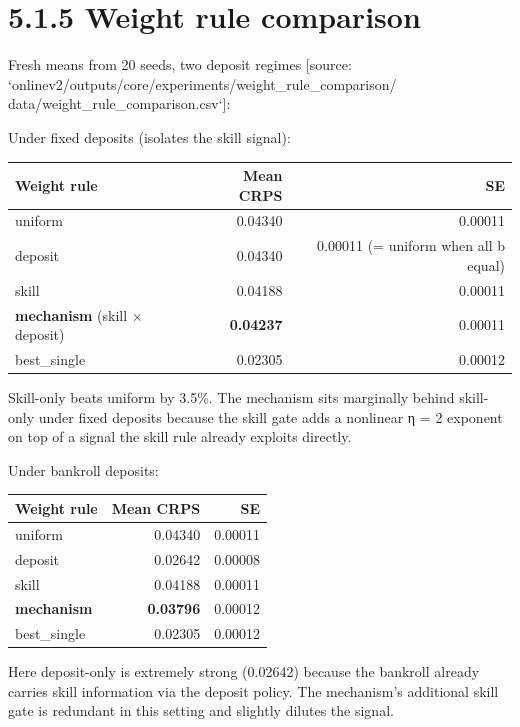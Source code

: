 \documentclass[11pt,a4paper,openany]{report}
\begin{document}
\section{5.1.5 Weight rule comparison}

Fresh means from 20 seeds, two deposit regimes
[source: `onlinev2/outputs/core/experiments/weight\_rule\_comparison/
data/weight\_rule\_comparison.csv`]:

Under fixed deposits (isolates the skill signal):

\begin{center}
\small
\begin{tabular}{lrr}
\toprule
\textbf{Weight rule} & \textbf{Mean CRPS} & \textbf{SE} \\
\midrule
uniform & 0.04340 & 0.00011 \\
deposit & 0.04340 & 0.00011 (= uniform when all b equal) \\
skill & 0.04188 & 0.00011 \\
\textbf{mechanism} (skill × deposit) & \textbf{0.04237} & 0.00011 \\
best\_single & 0.02305 & 0.00012 \\
\bottomrule
\end{tabular}
\end{center}

Skill-only beats uniform by 3.5\%. The mechanism sits marginally
behind skill-only under fixed deposits because the skill gate adds a
nonlinear η = 2 exponent on top of a signal the skill rule already
exploits directly.

Under bankroll deposits:

\begin{center}
\small
\begin{tabular}{lrr}
\toprule
\textbf{Weight rule} & \textbf{Mean CRPS} & \textbf{SE} \\
\midrule
uniform & 0.04340 & 0.00011 \\
deposit & 0.02642 & 0.00008 \\
skill & 0.04188 & 0.00011 \\
\textbf{mechanism} & \textbf{0.03796} & 0.00012 \\
best\_single & 0.02305 & 0.00012 \\
\bottomrule
\end{tabular}
\end{center}

Here deposit-only is extremely strong (0.02642) because the bankroll
already carries skill information via the deposit policy. The
mechanism's additional skill gate is redundant in this setting and
slightly dilutes the signal.
\end{document}
